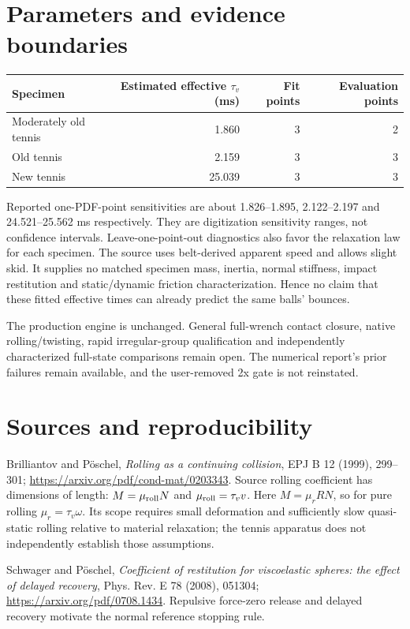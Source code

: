 \documentclass[10pt,a4paper]{article}
\begin{document}
\section*{Parameters and evidence boundaries}
\begin{center}\small
\begin{tabular}{lrrr}\hline
Specimen & Estimated effective $\tau_v$ (ms) & Fit points & Evaluation points\\\hline
Moderately old tennis & 1.860 & 3 & 2 \\
Old tennis & 2.159 & 3 & 3 \\
New tennis & 25.039 & 3 & 3 \\
\hline\end{tabular}\end{center}
Reported one-PDF-point sensitivities are about 1.826--1.895, 2.122--2.197 and
24.521--25.562 ms respectively. They are digitization sensitivity ranges, not
confidence intervals. Leave-one-point-out diagnostics also favor the relaxation
law for each specimen. The source uses belt-derived apparent speed and allows
slight skid. It supplies no matched specimen mass, inertia, normal stiffness,
impact restitution and static/dynamic friction characterization. Hence no claim
that these fitted effective times can already predict the same balls' bounces.

The production engine is unchanged. General full-wrench contact closure, native
rolling/twisting, rapid irregular-group qualification and independently characterized
full-state comparisons remain open. The numerical report's prior failures remain
available, and the user-removed 2x gate is not reinstated.

\newpage
\section*{Sources and reproducibility}
Brilliantov and P\"oschel, \emph{Rolling as a continuing collision},
EPJ B 12 (1999), 299--301;
\url{https://arxiv.org/pdf/cond-mat/0203343}.
Source rolling coefficient has dimensions of length: $M=\mu_{\rm roll}N$ and
$\mu_{\rm roll}=\tau_v v$. Here $M=\mu_r RN$, so for pure rolling $\mu_r=\tau_v\omega$.
Its scope requires small deformation and sufficiently slow quasi-static rolling
relative to material relaxation; the tennis apparatus does not independently
establish those assumptions.

Schwager and P\"oschel, \emph{Coefficient of restitution for viscoelastic spheres:
the effect of delayed recovery}, Phys. Rev. E 78 (2008), 051304;
\url{https://arxiv.org/pdf/0708.1434}. Repulsive force-zero release and delayed
recovery motivate the normal reference stopping rule.
\end{document}
